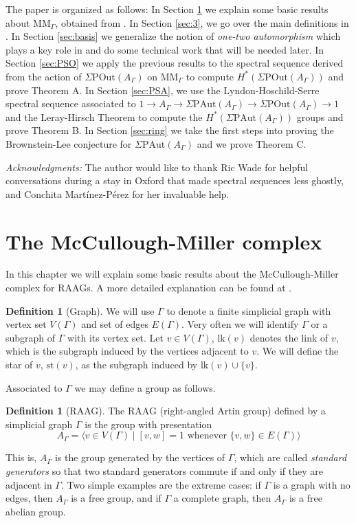 \documentclass[a4paper]{amsart}
\newcommand{\G}{\Gamma}
\newcommand{\A}{{A_\Gamma}}
\newcommand{\PAut}{\Sigma\mathrm{PAut}}
\newcommand{\POut}{\Sigma\mathrm{POut}}
\newcommand{\lk}{\mathrm{lk}}
\newcommand{\st}{\mathrm{st}}
\theoremstyle{definition}
\newtheorem{defi}[teo]{Definition}
\theoremstyle{remark}
\begin{document}
The paper is organized as follows: In Section \ref{sec:MM} we explain some basic results about MM$_\G$, obtained from \cite{ArMar}. In Section \ref{sec:3}, we go over the main definitions in \cite{JMcCM}. In Section \ref{sec:basis} we generalize the notion of \textit{one-two automorphism} which plays a key role in \cite{JMcCM} and do some technical work that will be needed later. In Section \ref{sec:PSO} we apply the previous results to the spectral sequence derived from the action of $\POut(A_\G)$ on MM$_\G$ to compute $H^*(\POut(A_\G))$ and prove Theorem A. In Section \ref{sec:PSA}, we use the Lyndon-Hoschild-Serre  spectral sequence associated to $
1\to A_\G\to \PAut(A_\G)\to \POut(A_\G) \to 1
$ and the Leray-Hirsch Theorem to compute the $H^*(\PAut(A_\G))$ groups and prove Theorem B. In Section \ref{sec:ring} we take the first steps into proving the Brownstein-Lee conjecture for $\PAut(A_\G)$ and we prove Theorem C.

{\sl Acknowledgments:} The author would like to thank Ric Wade for helpful conversations during a stay in Oxford that made spectral sequences less ghostly, and Conchita Martínez-Pérez for her invaluable help.





\section{The McCullough-Miller complex}\label{sec:MM}

In this chapter we will explain some basic results about the McCullough-Miller complex for RAAGs. A more detailed explanation can be found at \cite{ArMar}.
\begin{defi}[Graph]
    We will use $\Gamma$ to denote a finite simplicial graph with vertex set $V(\G)$ and set of edges $E(\G)$. Very often we will identify $\Gamma$ or a subgraph of $\Gamma$ with its vertex set. Let $v\in V(\G)$,  $\lk(v)$ denotes the link of $v$, which is the subgraph induced by the vertices adjacent to $v$. We will define the star of $v$, $\st(v)$, as the subgraph induced by $\lk(v)\cup\{v\}$.
\end{defi}

Associated to $\Gamma$ we may define a group as follows.

\begin{defi}[RAAG]
     The RAAG (right-angled Artin group) defined by a simplicial graph $\G$ is the group with presentation
    $$
A_{\Gamma}=\langle v \in V(\Gamma) \mid[v, w]=1 \textrm{ whenever } \{v, w\} \in E(\Gamma)\rangle
$$
\end{defi}
This is, $\A$ is the group generated by the vertices of $\Gamma$, which are called {\sl standard generators} so that two standard generators commute if and only if they are adjacent in $\Gamma$. Two simple examples are the extreme cases: if $\G$ is a graph with no edges, then $A_\G$ is a free group, and if $\G$ a complete graph, then $A_\G$ is a free abelian group.
\end{document}
